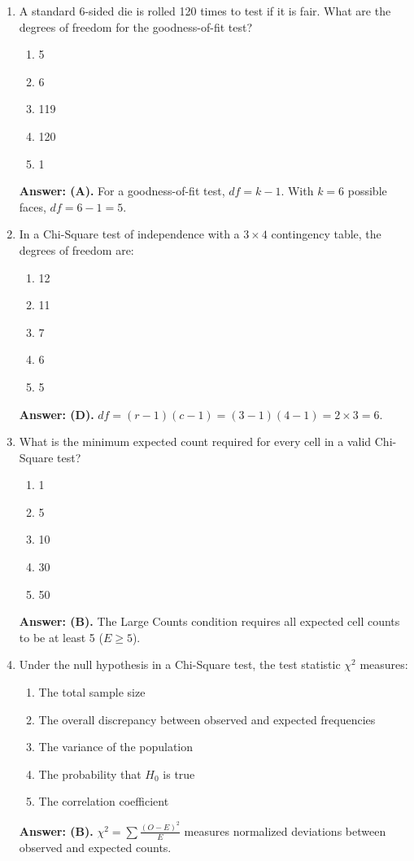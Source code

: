 \begin{enumerate}[leftmargin=1.5em]
  \item A standard 6-sided die is rolled 120 times to test if it is fair. What are the degrees of freedom for the goodness-of-fit test?
  \begin{enumerate}[label=(\Alph*)]
    \item 5 \item 6 \item 119 \item 120 \item 1
  \end{enumerate}
  \textbf{Answer: (A).} For a goodness-of-fit test, $df = k - 1$. With $k = 6$ possible faces, $df = 6 - 1 = 5$.

  \item In a Chi-Square test of independence with a $3 \times 4$ contingency table, the degrees of freedom are:
  \begin{enumerate}[label=(\Alph*)]
    \item 12 \item 11 \item 7 \item 6 \item 5
  \end{enumerate}
  \textbf{Answer: (D).} $df = (r - 1)(c - 1) = (3 - 1)(4 - 1) = 2 \times 3 = 6$.

  \item What is the minimum expected count required for every cell in a valid Chi-Square test?
  \begin{enumerate}[label=(\Alph*)]
    \item 1 \item 5 \item 10 \item 30 \item 50
  \end{enumerate}
  \textbf{Answer: (B).} The Large Counts condition requires all expected cell counts to be at least 5 ($E \ge 5$).

  \item Under the null hypothesis in a Chi-Square test, the test statistic $\chi^2$ measures:
  \begin{enumerate}[label=(\Alph*)]
    \item The total sample size \item The overall discrepancy between observed and expected frequencies \item The variance of the population \item The probability that $H_0$ is true \item The correlation coefficient
  \end{enumerate}
  \textbf{Answer: (B).} $\chi^2 = \sum \frac{(O-E)^2}{E}$ measures normalized deviations between observed and expected counts.


\end{enumerate}

